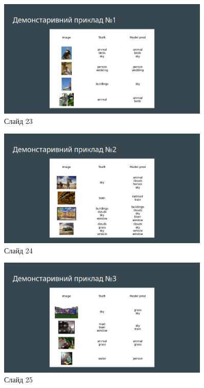 \documentclass{udstu}
\begin{document}
\begin{figure}[!ht]
	\centering
	\includegraphics[width=0.9\textwidth]{PNG/present/present-23}
	\caption{Слайд 23}
\end{figure}

\begin{figure}[!ht]
	\centering
	\includegraphics[width=0.9\textwidth]{PNG/present/present-24}
	\caption{Слайд 24}
\end{figure}

\begin{figure}[!ht]
	\centering
	\includegraphics[width=0.9\textwidth]{PNG/present/present-25}
	\caption{Слайд 25}
\end{figure}
\end{document}
